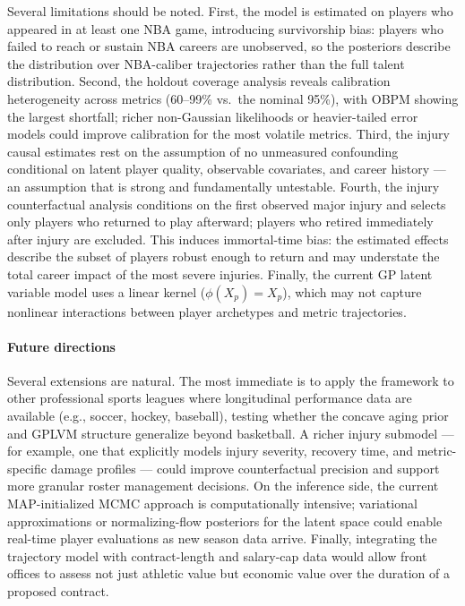 \documentclass[aoas]{imsart}
\begin{document}
Several limitations should be noted.
First, the model is estimated on players who appeared in at least one NBA game, introducing survivorship bias: players who failed to reach or sustain NBA careers are unobserved, so the posteriors describe the distribution over NBA-caliber trajectories rather than the full talent distribution.
Second, the holdout coverage analysis reveals calibration heterogeneity across metrics (60--99\% vs.\ the nominal 95\%), with OBPM showing the largest shortfall; richer non-Gaussian likelihoods or heavier-tailed error models could improve calibration for the most volatile metrics.
Third, the injury causal estimates rest on the assumption of no unmeasured confounding conditional on latent player quality, observable covariates, and career history --- an assumption that is strong and fundamentally untestable.
Fourth, the injury counterfactual analysis conditions on the first observed major injury and selects only players who returned to play afterward; players who retired immediately after injury are excluded.  This induces immortal-time bias: the estimated effects describe the subset of players robust enough to return and may understate the total career impact of the most severe injuries.
Finally, the current GP latent variable model uses a linear kernel ($\phi(X_p) = X_p$), which may not capture nonlinear interactions between player archetypes and metric trajectories.

\paragraph{Future directions}
Several extensions are natural.
The most immediate is to apply the framework to other professional sports leagues where longitudinal performance data are available (e.g., soccer, hockey, baseball), testing whether the concave aging prior and GPLVM structure generalize beyond basketball.
A richer injury submodel --- for example, one that explicitly models injury severity, recovery time, and metric-specific damage profiles --- could improve counterfactual precision and support more granular roster management decisions.
On the inference side, the current MAP-initialized MCMC approach is computationally intensive; variational approximations or normalizing-flow posteriors for the latent space could enable real-time player evaluations as new season data arrive.
Finally, integrating the trajectory model with contract-length and salary-cap data would allow front offices to assess not just athletic value but economic value over the duration of a proposed contract.


\clearpage





\clearpage
{\sloppy


}



\end{document}
